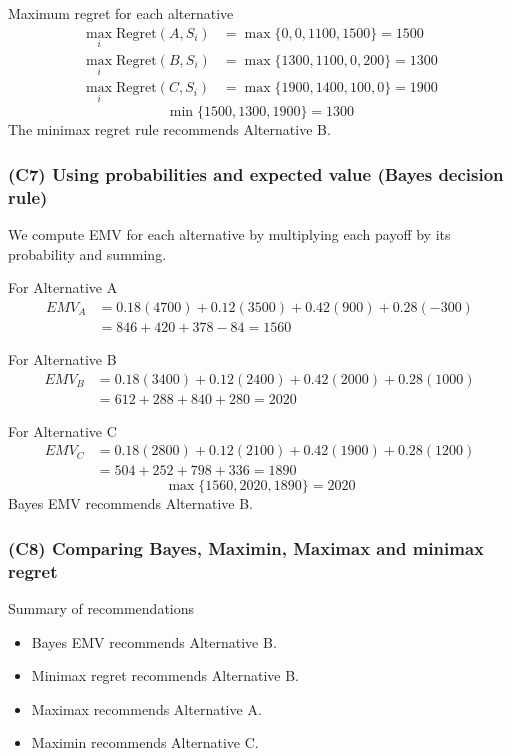 Maximum regret for each alternative
\[
\begin{aligned}
\max_i \text{Regret}(A, S_i) &= \max\{0, 0, 1100, 1500\} = 1500\\
\max_i \text{Regret}(B, S_i) &= \max\{1300, 1100, 0, 200\} = 1300\\
\max_i \text{Regret}(C, S_i) &= \max\{1900, 1400, 100, 0\} = 1900
\end{aligned}
\]
\[
\min\{1500, 1300, 1900\} = 1300
\]
The minimax regret rule recommends Alternative B.

\subsubsection{(C7) Using probabilities and expected value (Bayes decision rule)}\label{subsubsec:example2-1-c7}

We compute EMV for each alternative by multiplying each payoff by its probability and summing.

For Alternative A
\[
\begin{aligned}
EMV_A &= 0.18(4700) + 0.12(3500) + 0.42(900) + 0.28(-300)\\
&= 846 + 420 + 378 - 84 = 1560
\end{aligned}
\]

For Alternative B
\[
\begin{aligned}
EMV_B &= 0.18(3400) + 0.12(2400) + 0.42(2000) + 0.28(1000)\\
&= 612 + 288 + 840 + 280 = 2020
\end{aligned}
\]

For Alternative C
\[
\begin{aligned}
EMV_C &= 0.18(2800) + 0.12(2100) + 0.42(1900) + 0.28(1200)\\
&= 504 + 252 + 798 + 336 = 1890
\end{aligned}
\]
\[
\max\{1560, 2020, 1890\} = 2020
\]
Bayes EMV recommends Alternative B.

\subsubsection{(C8) Comparing Bayes, Maximin, Maximax and minimax regret}\label{subsubsec:example2-1-c8}

Summary of recommendations

\begin{itemize}
	\item Bayes EMV recommends Alternative B.
	\item Minimax regret recommends Alternative B.
	\item Maximax recommends Alternative A.
	\item Maximin recommends Alternative C.
\end{itemize}


